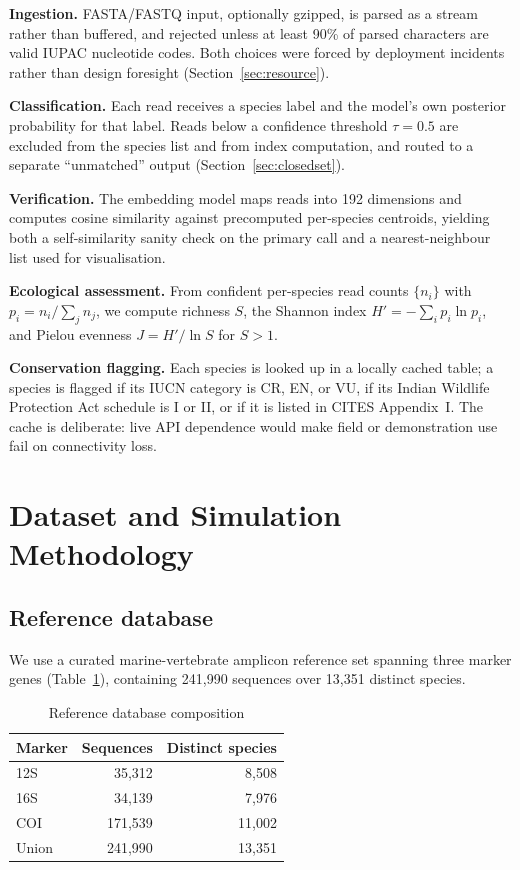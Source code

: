 \documentclass[conference]{IEEEtran}
\begin{document}
\textbf{Ingestion.} FASTA/FASTQ input, optionally gzipped, is parsed as a
stream rather than buffered, and rejected unless at least 90\% of parsed
characters are valid IUPAC nucleotide codes. Both choices were forced by
deployment incidents rather than design foresight
(Section~\ref{sec:resource}).

\textbf{Classification.} Each read receives a species label and the model's
own posterior probability for that label. Reads below a confidence
threshold $\tau=0.5$ are excluded from the species list and from index
computation, and routed to a separate ``unmatched'' output
(Section~\ref{sec:closedset}).

\textbf{Verification.} The embedding model maps reads into 192 dimensions
and computes cosine similarity against precomputed per-species centroids,
yielding both a self-similarity sanity check on the primary call and a
nearest-neighbour list used for visualisation.

\textbf{Ecological assessment.} From confident per-species read counts
$\{n_i\}$ with $p_i = n_i / \sum_j n_j$, we compute richness $S$, the
Shannon index \cite{shannon1948} $H' = -\sum_i p_i \ln p_i$, and Pielou
evenness $J = H'/\ln S$ for $S>1$.

\textbf{Conservation flagging.} Each species is looked up in a locally
cached table; a species is flagged if its IUCN category is CR, EN, or VU, if
its Indian Wildlife Protection Act schedule is I or II, or if it is listed
in CITES Appendix~I. The cache is deliberate: live API dependence would make
field or demonstration use fail on connectivity loss.

\section{Dataset and Simulation Methodology}
\label{sec:data}

\subsection{Reference database}
We use a curated marine-vertebrate amplicon reference set
\cite{oceanomics} spanning three marker genes
(Table~\ref{tab:reference}), containing 241{,}990 sequences over 13{,}351
distinct species.

\begin{table}[t]
\caption{Reference database composition}
\label{tab:reference}
\centering
\begin{tabular}{lrr}
\toprule
Marker & Sequences & Distinct species \\
\midrule
12S & 35{,}312 & 8{,}508 \\
16S & 34{,}139 & 7{,}976 \\
COI & 171{,}539 & 11{,}002 \\
\midrule
Union & 241{,}990 & 13{,}351 \\
\bottomrule
\end{tabular}
\end{table}
\end{document}

